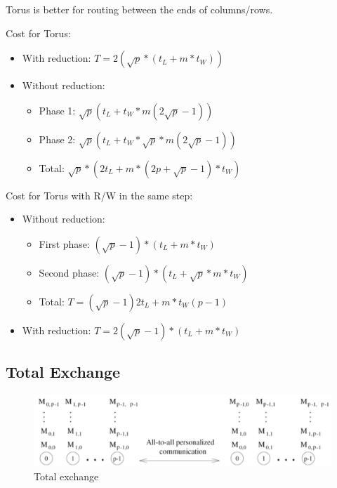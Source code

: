 \documentclass[11pt,a4paper]{report}
\begin{document}
Torus is better for routing between the ends of columns/rows.

Cost for Torus:

\begin{itemize}
    \item With reduction: $T = 2(\sqrt{p} * (t_{L} + m *t_{W}))$
    \item Without reduction:
    \begin{itemize}
        \item Phase 1:
        $ \sqrt{p} (t_{L} + t_{W} * m(2\sqrt{p}-1)) $
        
        \item Phase 2:
        $ \sqrt{p} (t_{L} + t_{W} * \sqrt{p} * m(2\sqrt{p}-1)) $
        
        \item Total:
        $ \sqrt{p} * (2t_{L} + m * (2p+\sqrt{p}-1) * t_{W}) $
    \end{itemize}
\end{itemize}

Cost for Torus with R/W in the same step:

\begin{itemize}
    \item Without reduction:
    \begin{itemize}
        \item First phase:
        $ (\sqrt{p}-1) * (t_{L} + m * t_{W}) $
        
        \item Second phase:
        $ (\sqrt{p}-1) * (t_{L} + \sqrt{p} * m * t_{W}) $
        
        \item Total:
        $ T = (\sqrt{p}-1) 2t_{L} + m * t_{W}(p-1) $
    \end{itemize}
    
    \item With reduction: $ T = 2(\sqrt{p}-1) * (t_{L} + m * t_{W}) $
\end{itemize}


\subsection{Total Exchange}

\begin{figure}[H]
\centering
\includegraphics[width=0.7\linewidth]{img/comm_total-exchange}
\caption{Total exchange}
\label{fig:commtotal-exchange}
\end{figure}
\end{document}
